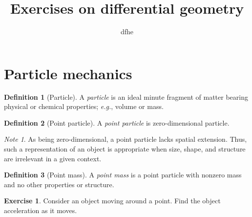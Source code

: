 \documentclass[aps,pra,10pt,a4paper]{revtex4-1}
\theoremstyle{plain}
\theoremstyle{definition}
\newtheorem{definition}{Definition}
\newtheorem{exercise}{Exercise}
\theoremstyle{remark}
\newtheorem*{note}{Note}
\providecommand*{\lingo}[1]{\textsl{#1}}
\providecommand*{\lingform}[1]{\textit{#1}}
\providecommand*{\eg}{\lingform{e.g.}}
\begin{document}
%
\title{Exercises on differential geometry}
\author{dfhe}
%
%

\section{Particle mechanics}
%
\begin{definition}[Particle]
  A \lingo{particle} is an ideal minute fragment of matter bearing physical or chemical properties; \eg, volume or mass.
\end{definition}

\begin{definition}[Point particle]
  A \lingo{point particle} is zero-dimensional particle.
\end{definition}

\begin{note}
  As being zero-dimensional, a point particle lacks spatial extension. Thus, such a representation of an object is appropriate when size, shape, and structure are irrelevant in a given context.
\end{note}

\begin{definition}[Point mass]
  A \lingo{point mass} is a point particle with nonzero mass and no other properties or structure.
\end{definition}

\begin{exercise}
  Consider an object moving around a point. Find the object acceleration as it moves.
\end{exercise}
\end{document}
